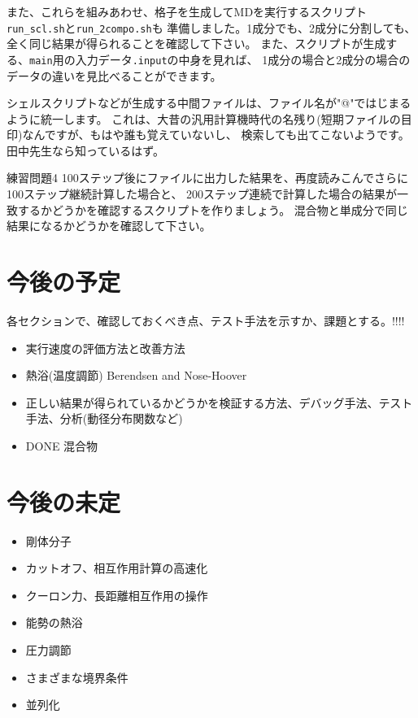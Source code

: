 \documentclass[a4,10pt]{article}
\begin{document}
また、これらを組みあわせ、格子を生成してMDを実行するスクリプト{\tt run\_scl.sh}と{\tt run\_2compo.sh}も
準備しました。1成分でも、2成分に分割しても、全く同じ結果が得られることを確認して下さい。
また、スクリプトが生成する、{\tt main}用の入力データ{\tt *.input}の中身を見れば、
1成分の場合と2成分の場合のデータの違いを見比べることができます。

\begin{shadebox}
    シェルスクリプトなどが生成する中間ファイルは、ファイル名が"@"ではじまるように統一します。
    これは、大昔の汎用計算機時代の名残り(短期ファイルの目印)なんですが、もはや誰も覚えていないし、
    検索しても出てこないようです。田中先生なら知っているはず。
\end{shadebox}


\begin{itembox}[l]{練習問題4}
100ステップ後にファイルに出力した結果を、再度読みこんでさらに100ステップ継続計算した場合と、
    200ステップ連続で計算した場合の結果が一致するかどうかを確認するスクリプトを作りましょう。	混合物と単成分で同じ結果になるかどうかを確認して下さい。
    \end{itembox}



\section{今後の予定}

各セクションで、確認しておくべき点、テスト手法を示すか、課題とする。!!!!

\begin{itemize}
\item 実行速度の評価方法と改善方法
\item 熱浴(温度調節) Berendsen and Nose-Hoover
\item 正しい結果が得られているかどうかを検証する方法、デバッグ手法、テスト手法、分析(動径分布関数など)
\item DONE 混合物
\end{itemize}
\section{今後の未定}
\begin{itemize}
\item 剛体分子
\item カットオフ、相互作用計算の高速化
\item クーロン力、長距離相互作用の操作
\item 能勢の熱浴
\item 圧力調節
\item さまざまな境界条件
\item 並列化
\end{itemize}
\end{document}
